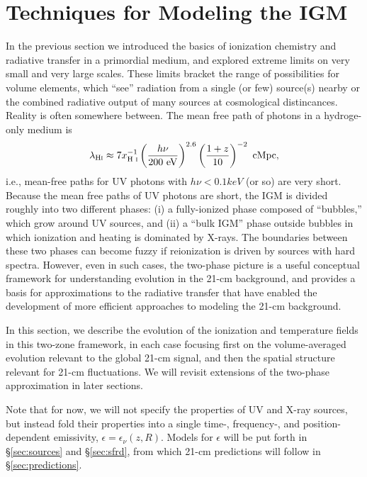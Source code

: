 \section{Techniques for Modeling the IGM} \label{sec:techniques}
In the previous section we introduced the basics of ionization chemistry and radiative transfer in a primordial medium, and explored extreme limits on very small and very large scales. These limits bracket the range of possibilities for volume elements, which ``see'' radiation from a single (or few) source(s) nearby or the combined radiative output of many sources at cosmological distincances. {\color{red} Reality is often somewhere between.} The mean free path of photons in a hydroge-only medium is \cite{McQuinn2012}
\begin{equation}
	\lambda_{\text{H} {\textsc{i}}} \approx 7 x_{\text{H } \textsc{i}}^{-1} \left(\frac{h\nu}{200 \ \mathrm{eV}} \right)^{2.6} \left(\frac{1+z}{10} \right)^{-2} \ \mathrm{cMpc} ,
\end{equation}
i.e., mean-free paths for UV photons with $h\nu < 0.1 keV$ (or so) are very short. Because the mean free paths of UV photons are short, the IGM is divided roughly into two different phases: (i) a fully-ionized phase composed of ``bubbles,'' which grow around UV sources, and (ii) a ``bulk IGM'' phase outside bubbles in which ionization and heating is dominated by X-rays. The boundaries between these two phases can become fuzzy if reionization is driven by sources with hard spectra. However, even in such cases, the two-phase picture is a useful conceptual framework for understanding evolution in the 21-cm background, and provides a basis for approximations to the radiative transfer that have enabled the development of more efficient approaches to modeling the 21-cm background. 

In this section, we describe the evolution of the ionization and temperature fields in this two-zone framework, in each case focusing first on the volume-averaged evolution relevant to the global 21-cm signal, and then the spatial structure relevant for 21-cm fluctuations. We will revisit extensions of the two-phase approximation in later sections.

Note that for now, we will not specify the properties of UV and X-ray sources, but instead fold their properties into a single time-, frequency-, and position-dependent emissivity, $\epsilon = \epsilon_{\nu}(z,R)$. Models for $\epsilon$ will be put forth in \S\ref{sec:sources} and \S\ref{sec:sfrd}, from which 21-cm predictions will follow in \S\ref{sec:predictions}. 

